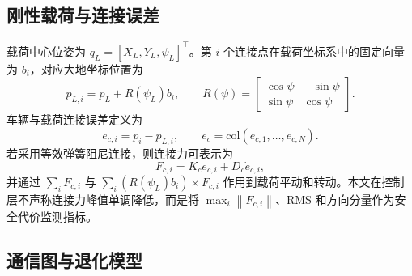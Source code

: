 \documentclass[twocolumn,3p,times,procedia]{elsarticle}
\newcommand{\norm}[1]{\left\lVert #1 \right\rVert}
\begin{document}
\subsection{刚性载荷与连接误差}

载荷中心位姿为 $q_L=[X_L,Y_L,\psi_L]^\top$。第 $i$ 个连接点在载荷坐标系中的固定向量为 $b_i$，对应大地坐标位置为
\begin{equation}
p_{L,i}=p_L+R(\psi_L)b_i,\qquad
R(\psi)=\begin{bmatrix}\cos\psi&-\sin\psi\\ \sin\psi&\cos\psi\end{bmatrix}.
\label{eq:payload_anchor}
\end{equation}
车辆与载荷连接误差定义为
\begin{equation}
e_{c,i}=p_i-p_{L,i},\qquad
e_c=\mathrm{col}(e_{c,1},\ldots,e_{c,N}).
\label{eq:connection_error}
\end{equation}
若采用等效弹簧阻尼连接，则连接力可表示为
\begin{equation}
F_{c,i}=K_c e_{c,i}+D_c\dot e_{c,i},
\label{eq:connection_force}
\end{equation}
并通过 $\sum_i F_{c,i}$ 与 $\sum_i (R(\psi_L)b_i)\times F_{c,i}$ 作用到载荷平动和转动。本文在控制层不声称连接力峰值单调降低，而是将 $\max_i\norm{F_{c,i}}$、RMS 和方向分量作为安全代价监测指标。

\subsection{通信图与退化模型}
\end{document}
